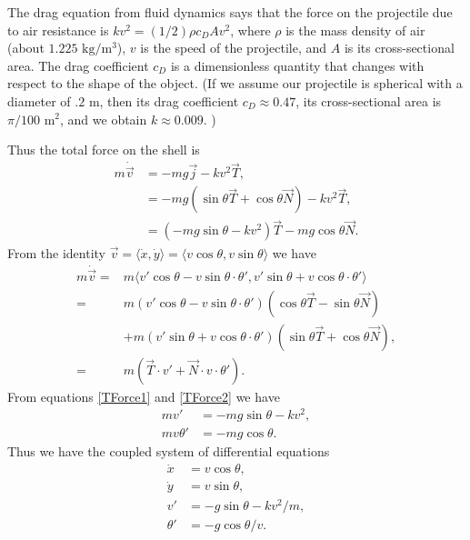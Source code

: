 The drag equation from fluid dynamics says that the force on the projectile due to air resistance is $k v^2 = (1/2)\rho c_D A v^2$, where $\rho$ is the mass density of air (about $1.225$ $\text{kg}/\text{m}^3$), $v$ is the speed of the projectile, and $A$ is its cross-sectional area.  The drag coefficient $c_D$ is a dimensionless quantity that changes with respect to the shape of the object. (If we assume our projectile is spherical with a diameter of $.2$ m, then its drag coefficient $c_D \approx 0.47$, its cross-sectional area is $\pi/100$ $ \text{m}^2$, and we obtain $k \approx 0.009.$ )


Thus the total force on the shell is 
\begin{align}
m \dot{\vec{v}} &= -mg \vec{j} - kv^2 \vec{T},\nonumber \\
&= -mg( \sin{\theta} \vec{T} + \cos{\theta} \vec{N} ) - kv^2 \vec{T},\nonumber\\
&= (-mg \sin{\theta} - k v^2 ) \vec{T} - mg \cos{\theta} \vec{N}.\label{TForce1}
\end{align}
From the identity 
$\vec{v} = \langle \dot{x}, \dot{y} \rangle = \langle v \cos{\theta}, v \sin{\theta} \rangle$ 
we have 
\begin{align}
m \dot{\vec{v}} = {} & m\langle v' \cos{\theta} - v\sin{\theta} \cdot \theta' ,v'\sin{\theta} + v\cos{\theta} \cdot \theta' \rangle \nonumber \\
= {} & m(v'\cos{\theta} - v\sin{\theta} \cdot \theta')(\cos{\theta} \vec{T} - \sin{\theta}\vec{N}) \nonumber \\
& + m(v' \sin{\theta} + v\cos{\theta} \cdot \theta')( \sin{\theta} \vec{T} + \cos{\theta} \vec{N}) ,  \nonumber \\
= {} & m(\vec{T} \cdot v' + \vec{N} \cdot v \cdot \theta') . \label{TForce2}
\end{align}
From equations \eqref{TForce1} and \eqref{TForce2} we have 
\begin{align*}
mv' &= -mg\sin{\theta} - k v^2,\\
mv\theta' &= -mg \cos{\theta}.
\end{align*}
Thus we have the coupled system of differential equations
\begin{align}
\dot{x} &= v\cos{\theta}, \nonumber \\
\dot{y} &= v\sin{\theta},\nonumber \\
v' &= -g\sin{\theta} -  k v^2/m,\nonumber \\
\theta' &= -g \cos{\theta}/v. \nonumber
\end{align}
